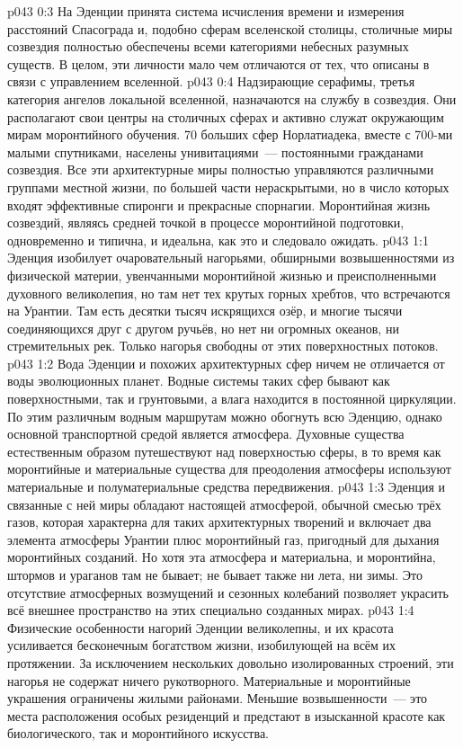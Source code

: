 \vs p043 0:3 \pc На Эденции принята система исчисления времени и измерения расстояний Спасограда и, подобно сферам вселенской столицы, столичные миры созвездия полностью обеспечены всеми категориями небесных разумных существ. В целом, эти личности мало чем отличаются от тех, что описаны в связи с управлением вселенной.
\vs p043 0:4 Надзирающие серафимы, третья категория ангелов локальной вселенной, назначаются на службу в созвездия. Они располагают свои центры на столичных сферах и активно служат окружающим мирам моронтийного обучения. 70 больших сфер Норлатиадека, вместе с 700-ми малыми спутниками, населены унивитациями~--- постоянными гражданами созвездия. Все эти архитектурные миры полностью управляются различными группами местной жизни, по большей части нераскрытыми, но в число которых входят эффективные спиронги и прекрасные спорнагии. Моронтийная жизнь созвездий, являясь средней точкой в процессе моронтийной подготовки, одновременно и типична, и идеальна, как это и следовало ожидать.
\vs p043 1:1 Эденция изобилует очаровательный нагорьями, обширными возвышенностями из физической материи, увенчанными моронтийной жизнью и преисполненными духовного великолепия, но там нет тех крутых горных хребтов, что встречаются на Урантии. Там есть десятки тысяч искрящихся озёр, и многие тысячи соединяющихся друг с другом ручьёв, но нет ни огромных океанов, ни стремительных рек. Только нагорья свободны от этих поверхностных потоков.
\vs p043 1:2 Вода Эденции и похожих архитектурных сфер ничем не отличается от воды эволюционных планет. Водные системы таких сфер бывают как поверхностными, так и грунтовыми, а влага находится в постоянной циркуляции. По этим различным водным маршрутам можно обогнуть всю Эденцию, однако основной транспортной средой является атмосфера. Духовные существа естественным образом путешествуют над поверхностью сферы, в то время как моронтийные и материальные существа для преодоления атмосферы используют материальные и полуматериальные средства передвижения.
\vs p043 1:3 Эденция и связанные с ней миры обладают настоящей атмосферой, обычной смесью трёх газов, которая характерна для таких архитектурных творений и включает два элемента атмосферы Урантии плюс моронтийный газ, пригодный для дыхания моронтийных созданий. Но хотя эта атмосфера и материальна, и моронтийна, штормов и ураганов там не бывает; не бывает также ни лета, ни зимы. Это отсутствие атмосферных возмущений и сезонных колебаний позволяет украсить всё внешнее пространство на этих специально созданных мирах.
\vs p043 1:4 Физические особенности нагорий Эденции великолепны, и их красота усиливается бесконечным богатством жизни, изобилующей на всём их протяжении. За исключением нескольких довольно изолированных строений, эти нагорья не содержат ничего рукотворного. Материальные и моронтийные украшения ограничены жилыми районами. Меньшие возвышенности~--- это места расположения особых резиденций и предстают в изысканной красоте как биологического, так и моронтийного искусства.
